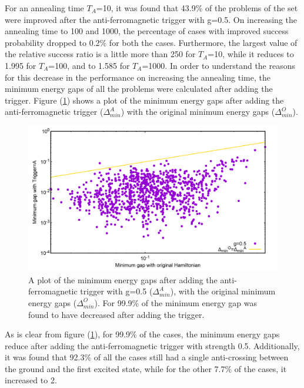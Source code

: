 \documentclass[../main.tex]{subfiles}
\begin{document}
For an annealing time $T_A$=10, it was found that 43.9\% of the problems of the set were improved after the anti-ferromagnetic trigger with g=0.5. On increasing the annealing time to 100 and 1000, the percentage of cases with improved success probability dropped to 0.2\% for both the cases. Furthermore, the largest value of the relative success ratio is a little more than 250 for $T_A$=10, while it reduces to 1.995 for $T_A$=100, and to 1.585 for $T_A$=1000. In order to understand the reasons for this decrease in the performance on increasing the annealing time, the minimum energy gaps of all the problems were calculated after adding the trigger. Figure (\ref{fig:a13}) shows a plot of the minimum energy gaps after adding the anti-ferromagnetic trigger ($\Delta_{min}^A$) with the original minimum energy gaps ($\Delta_{min}^O$).
\begin{figure}[H]
\centering 
\includegraphics[scale=0.24]{MinGap_A_g0.png}
\caption{A plot of the minimum energy gaps after adding the anti-ferromagnetic trigger with g=0.5 ($\Delta_{min}^A$), with the original minimum energy gaps ($\Delta_{min}^O$). For 99.9\% of the minimum energy gap was found to have decreased after adding the trigger.}
\label{fig:a13}
\end{figure}
As is clear from figure (\ref{fig:a13}), for 99.9\% of the cases, the minimum energy gaps reduce after adding the anti-ferromagnetic trigger with strength 0.5. Additionally, it was found that 92.3\% of all the cases still had a single anti-crossing between the ground and the first excited state, while for the other 7.7\% of the cases, it increased to 2.
\end{document}
